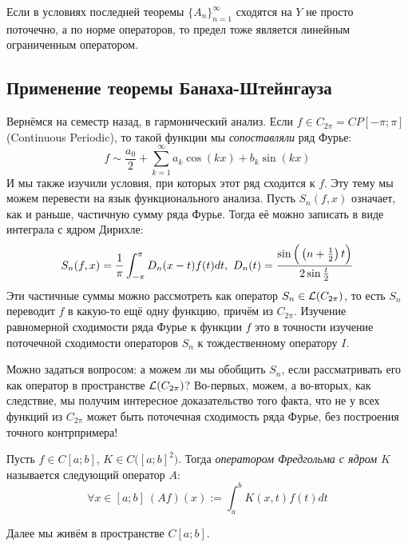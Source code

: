 \begin{corollary}
	Если в условиях последней теоремы $\{A_n\}_{n = 1}^\infty$ сходятся на $Y$ не просто поточечно, а по норме операторов, то предел тоже является линейным ограниченным оператором.
\end{corollary}

\subsection*{Применение теоремы Банаха-Штейнгауза}

\begin{problem}
	Вернёмся на семестр назад, в гармонический анализ. Если $f \in C_{2\pi} = CP[-\pi; \pi]$ (Continuous Periodic), то такой функции мы \textit{сопоставляли} ряд Фурье:
	\[
		f \sim \frac{a_0}{2} + \sum_{k = 1}^\infty a_k\cos(kx) + b_k\sin(kx)
	\]
	И мы также изучили условия, при которых этот ряд сходится к $f$. Эту тему мы можем перевести на язык функционального анализа. Пусть $S_n(f, x)$ означает, как и раньше, частичную сумму ряда Фурье. Тогда её можно записать в виде интеграла с ядром Дирихле:
	\[
		S_n(f, x) = \frac{1}{\pi}\int_{-\pi}^\pi D_n(x - t)f(t)dt,\ D_n(t) = \frac{\sin\Big(\left(n + \frac{1}{2}\right)t\Big)}{2\sin\frac{t}{2}}
	\]
	Эти частичные суммы можно рассмотреть как оператор $S_n \in \mathcal{L}(C_{2\pi})$, то есть $S_n$ переводит $f$ в какую-то ещё одну функцию, причём из $C_{2\pi}$. Изучение равномерной сходимости ряда Фурье к функции $f$ это в точности изучение поточечной сходимости операторов $S_n$ к тождественному оператору $I$.
	
	Можно задаться вопросом: а можем ли мы обобщить $S_n$, если рассматривать его как оператор в пространстве $\mathcal{L}(C_{2\pi})$? Во-первых, можем, а во-вторых, как следствие, мы получим интересное доказательство того факта, что не у всех функций из $C_{2\pi}$ может быть поточечная сходимость ряда Фурье, без построения точного контрпримера!
\end{problem}

\begin{definition}
	Пусть $f \in C[a; b]$, $K \in C\big([a; b]^2\big)$. Тогда \textit{оператором Фредгольма с ядром $K$} называется следующий оператор $A$:
	\[
		\forall x \in [a; b]\ (Af)(x) := \int_a^b K(x, t)f(t)dt
	\]
\end{definition}

\begin{note}
	Далее мы живём в пространстве $C[a; b]$.
\end{note}


